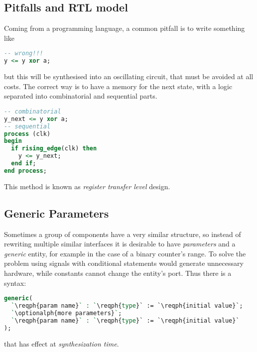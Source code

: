 \subsection{Pitfalls and RTL model}
Coming from a programming language, a common pitfall is to write something like
\begin{center}
  \begin{minipage}{.4\linewidth}
    \begin{lstlisting}[language=vhdl]
-- wrong!!!
y <= y xor a;
    \end{lstlisting}
  \end{minipage}
  \begin{minipage}{.4\linewidth}
    \centering
  \end{minipage}
\end{center}
but this will be synthesised into an oscillating circuit, that must be avoided
at all costs. The correct way is to have a memory for the next state, with a
logic separated into combinatorial and sequential parts.
\begin{lstlisting}[language=vhdl]
-- combinatorial
y_next <= y xor a;
-- sequential
process (clk)
begin
  if rising_edge(clk) then
    y <= y_next;
  end if;
end process;
\end{lstlisting}
This method is known as \emph{register transfer level} design.

\subsection{Generic Parameters}
Sometimes a group of components have a very similar structure, so instead of
rewriting multiple similar interfaces it is desirable to have \emph{parameters}
and a \emph{generic} entity, for example in the case of a binary counter's
range. To solve the problem using signals with conditional statements would
generate unnecessary hardware, while constants cannot change the entity's port.
Thus there is a syntax:
\begin{lstlisting}[language=vhdl]
generic(
  `\reqph{param name}` : `\reqph{type}` := `\reqph{initial value}`;
  `\optionalph{more parameters}`;
  `\reqph{param name}` : `\reqph{type}` := `\reqph{initial value}`
);
\end{lstlisting}
that has effect at \emph{synthesization time}.

